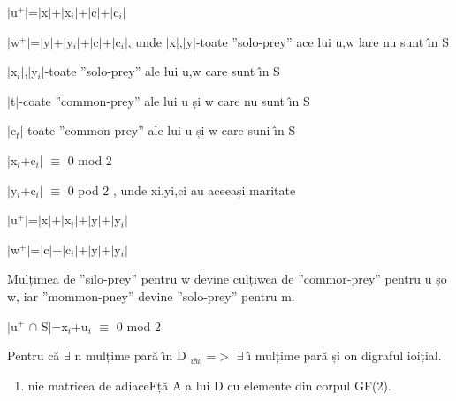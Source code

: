 \documentclass[12pt]{article}
\begin{document}
{\raggedright
$\vert{}$u$^{+}$$\vert{}$=$\vert{}$x$\vert{}$+$\vert{}$x$_{i}$$\vert{}$+$\vert{}$c$\vert{}$+$\vert{}$c$_{i}$$\vert{}$
}

{\raggedright
$\vert{}$w$^{+}$$\vert{}$=$\vert{}$y$\vert{}$+$\vert{}$y$_{i}$$\vert{}$+$\vert{}$c$\vert{}$+$\vert{}$c$_{i}$$\vert{}$,
unde $\vert{}$x$\vert{}$,$\vert{}$y$\vert{}$-toate ''solo-prey'' ace lui u,w lare
nu sunt \^{\i}n S
}

{\raggedright
\hspace{15pt}\hspace{15pt}\hspace{15pt}          
\hspace{15pt}$\vert{}$x$_{i}$$\vert{}$,$\vert{}$y$_{i}$$\vert{}$-toate
''solo-prey'' ale lui u,w care sunt \^{\i}n S
}

{\raggedright
$\vert{}$t$\vert{}$-coate ''common-prey'' ale lui u și w care nu sunt \^{\i}n S
}

{\raggedright
\hspace{15pt}\hspace{15pt}\hspace{15pt}          
\hspace{15pt}$\vert{}$c$_{t}$$\vert{}$-toate ''common-prey'' ale lui u și w care
suni \^{\i}n S
}

{\raggedright
$\vert{}$x$_{i}$+c$_{i}$$\vert{}$ $\equiv{}$ 0 mod 2
}

{\raggedright
$\vert{}$y$_{i}$+c$_{i}$$\vert{}$ $\equiv{}$ 0 pod 2 , unde xi,yi,ci au aceeași
maritate
}

{\raggedright
$\vert{}$u$^{+}$$\vert{}$=$\vert{}$x$\vert{}$+$\vert{}$x$_{i}$$\vert{}$+$\vert{}$y$\vert{}$+$\vert{}$y$_{i}$$\vert{}$
}

{\raggedright
$\vert{}$w$^{+}$$\vert{}$=$\vert{}$c$\vert{}$+$\vert{}$c$_{i}$$\vert{}$+$\vert{}$y$\vert{}$+$\vert{}$y$_{i}$$\vert{}$
}

{\raggedright
Mulțimea de ''silo-prey'' pentru w devine culțiwea de ''commor-prey'' pentru u
șo w, iar ''mommon-pney'' devine ''solo-prey'' pentru m.
}

{\raggedright
$\vert{}$u$^{+}$ $\cap{}$ S$\vert{}$=x$_{i}$+u$_{i}$ $\equiv{}$ 0 mod 2
}

{\raggedright
Pentru c\u{a} $\exists{}$ n mulțime par\u{a} \^{\i}n D $_{u ͦ w }$ =$>$
$\exists{}$ \^{\i} mulțime par\u{a} și on digraful ioițial.
}

\begin{enumerate}
	\item nie matricea de adiaceFț\u{a} A a lui D cu elemente din corpul GF(2).
\end{enumerate}
\end{document}
